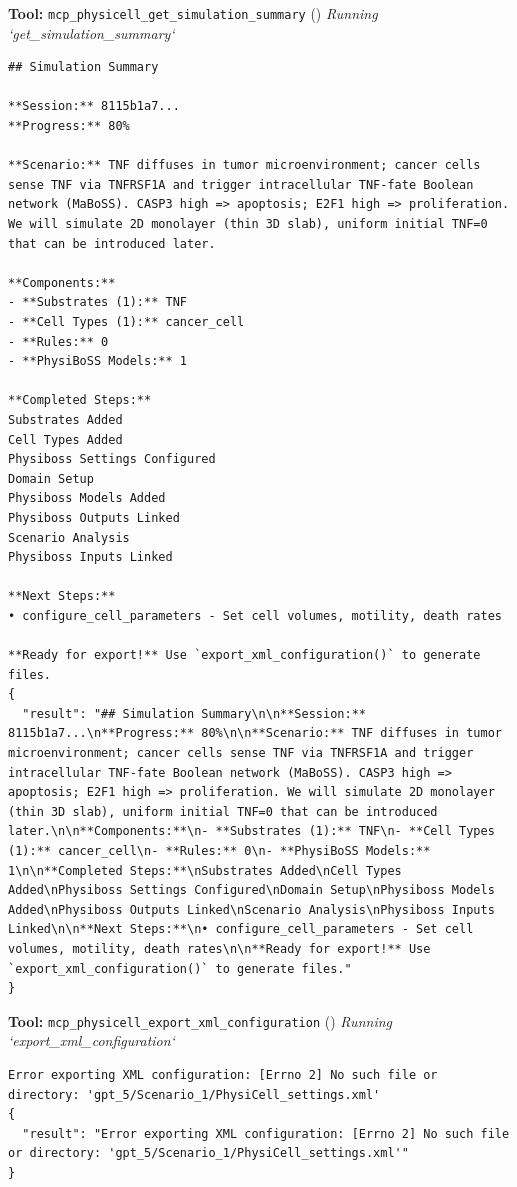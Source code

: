 \documentclass[11pt,a4paper]{article}
\begin{document}
\begin{toolokbox}
\textbf{Tool:} \texttt{mcp\_physicell\_get\_simulation\_summary} (\checkmark)
\textit{Running `get\_simulation\_summary`}
\begin{lstlisting}
## Simulation Summary

**Session:** 8115b1a7...
**Progress:** 80%

**Scenario:** TNF diffuses in tumor microenvironment; cancer cells sense TNF via TNFRSF1A and trigger intracellular TNF-fate Boolean network (MaBoSS). CASP3 high => apoptosis; E2F1 high => proliferation. We will simulate 2D monolayer (thin 3D slab), uniform initial TNF=0 that can be introduced later.

**Components:**
- **Substrates (1):** TNF
- **Cell Types (1):** cancer_cell
- **Rules:** 0
- **PhysiBoSS Models:** 1

**Completed Steps:**
Substrates Added
Cell Types Added
Physiboss Settings Configured
Domain Setup
Physiboss Models Added
Physiboss Outputs Linked
Scenario Analysis
Physiboss Inputs Linked

**Next Steps:**
• configure_cell_parameters - Set cell volumes, motility, death rates

**Ready for export!** Use `export_xml_configuration()` to generate files.
{
  "result": "## Simulation Summary\n\n**Session:** 8115b1a7...\n**Progress:** 80%\n\n**Scenario:** TNF diffuses in tumor microenvironment; cancer cells sense TNF via TNFRSF1A and trigger intracellular TNF-fate Boolean network (MaBoSS). CASP3 high => apoptosis; E2F1 high => proliferation. We will simulate 2D monolayer (thin 3D slab), uniform initial TNF=0 that can be introduced later.\n\n**Components:**\n- **Substrates (1):** TNF\n- **Cell Types (1):** cancer_cell\n- **Rules:** 0\n- **PhysiBoSS Models:** 1\n\n**Completed Steps:**\nSubstrates Added\nCell Types Added\nPhysiboss Settings Configured\nDomain Setup\nPhysiboss Models Added\nPhysiboss Outputs Linked\nScenario Analysis\nPhysiboss Inputs Linked\n\n**Next Steps:**\n• configure_cell_parameters - Set cell volumes, motility, death rates\n\n**Ready for export!** Use `export_xml_configuration()` to generate files."
}
\end{lstlisting}
\end{toolokbox}
\begin{toolokbox}
\textbf{Tool:} \texttt{mcp\_physicell\_export\_xml\_configuration} (\checkmark)
\textit{Running `export\_xml\_configuration`}
\begin{lstlisting}
Error exporting XML configuration: [Errno 2] No such file or directory: 'gpt_5/Scenario_1/PhysiCell_settings.xml'
{
  "result": "Error exporting XML configuration: [Errno 2] No such file or directory: 'gpt_5/Scenario_1/PhysiCell_settings.xml'"
}
\end{lstlisting}
\end{toolokbox}
\end{document}
